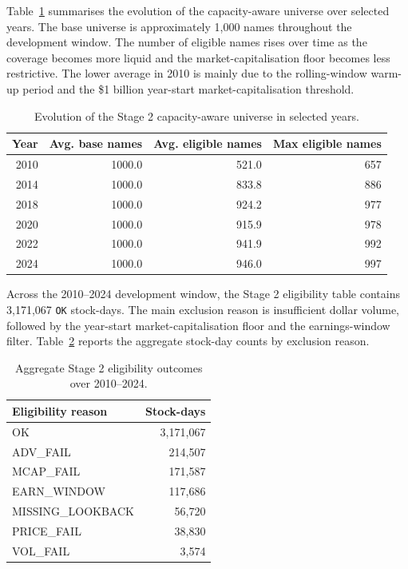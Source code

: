 \documentclass[12pt]{article}
\begin{document}
Table~\ref{tab:stage2_yearly} summarises the evolution of the capacity-aware universe over selected years. The base universe is approximately 1,000 names throughout the development window. The number of eligible names rises over time as the coverage becomes more liquid and the market-capitalisation floor becomes less restrictive. The lower average in 2010 is mainly due to the rolling-window warm-up period and the \$1 billion year-start market-capitalisation threshold.

\begin{table}[htbp]
\centering
\small
\begin{tabular}{rrrr}
\hline
Year & Avg. base names & Avg. eligible names & Max eligible names \\
\hline
2010 & 1000.0 & 521.0 & 657 \\
2014 & 1000.0 & 833.8 & 886 \\
2018 & 1000.0 & 924.2 & 977 \\
2020 & 1000.0 & 915.9 & 978 \\
2022 & 1000.0 & 941.9 & 992 \\
2024 & 1000.0 & 946.0 & 997 \\
\hline
\end{tabular}
\caption{Evolution of the Stage 2 capacity-aware universe in selected years.}
\label{tab:stage2_yearly}
\end{table}

Across the 2010--2024 development window, the Stage 2 eligibility table contains 3,171,067 \texttt{OK} stock-days. The main exclusion reason is insufficient dollar volume, followed by the year-start market-capitalisation floor and the earnings-window filter. Table~\ref{tab:stage2_reasons} reports the aggregate stock-day counts by exclusion reason.

\begin{table}[htbp]
\centering
\small
\begin{tabular}{lr}
\hline
Eligibility reason & Stock-days \\
\hline
OK & 3,171,067 \\
ADV\_FAIL & 214,507 \\
MCAP\_FAIL & 171,587 \\
EARN\_WINDOW & 117,686 \\
MISSING\_LOOKBACK & 56,720 \\
PRICE\_FAIL & 38,830 \\
VOL\_FAIL & 3,574 \\
\hline
\end{tabular}
\caption{Aggregate Stage 2 eligibility outcomes over 2010--2024.}
\label{tab:stage2_reasons}
\end{table}
\end{document}
